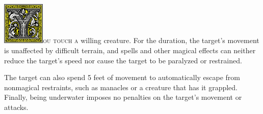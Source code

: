 \documentclass[12pt,showtrims]{memoir}
\begin{document}
\vspace{1\baselineskip}\noindent 
\lettrine[lines=4]{\includegraphics[height=58pt]{initials/Y.png}}{ou touch a} willing creature. For the duration, the target’s movement is unaffected by difficult terrain, and spells and other magical effects can neither reduce the target’s speed nor cause the target to be paralyzed or restrained.

The target can also spend 5 feet of movement to automatically escape from nonmagical restraints, such as manacles or a creature that has it grappled. Finally, being underwater imposes no penalties on the target’s movement or attacks.

\newpage
{}
\newpage
\end{document}

